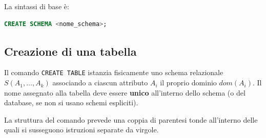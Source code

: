 La sintassi di base è:
\begin{lstlisting}[language=SQL]
CREATE SCHEMA <nome_schema>;
\end{lstlisting}

\subsection{Creazione di una tabella}
Il comando \texttt{CREATE TABLE} istanzia fisicamente uno schema relazionale $S(A_1, \dots, A_k)$ associando a ciascun attributo $A_i$ il proprio dominio $dom(A_i)$.
Il nome assegnato alla tabella deve essere \textbf{unico} all'interno dello schema (o del database, se non si usano schemi espliciti).

La struttura del comando prevede una coppia di parentesi tonde all'interno delle quali si susseguono istruzioni separate da virgole. 

